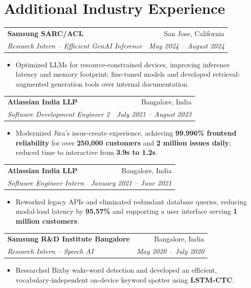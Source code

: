 \documentclass[letterpaper,11pt]{article}
\makeatletter
\newcommand{\role}[4]{%
  \Needspace{4\baselineskip}%
  \begin{tabularx}{\linewidth}{@{}Xr@{}}
    \textbf{#1} & \small #2\\
    \textit{#3} & \small\textit{#4}
  \end{tabularx}\vspace{-1pt}}
\makeatother
\begin{document}
\newpage
\section{Additional Industry Experience}
\role{Samsung SARC/ACL}{San Jose, California}
  {Research Intern -- Efficient GenAI Inference}{May 2024 -- August 2024}
\begin{itemize}
  \item Optimized LLMs for resource-constrained devices, improving inference latency and memory footprint; fine-tuned models and developed retrieval-augmented generation tools over internal documentation.
\end{itemize}
\role{Atlassian India LLP}{Bangalore, India}
  {Software Development Engineer 2}{July 2021 -- August 2023}
\begin{itemize}
  \item Modernized Jira's issue-create experience, achieving \textbf{99.996\% frontend reliability} for over \textbf{250,000 customers} and \textbf{2 million issues daily}; reduced time to interactive from \textbf{3.9s to 1.2s}.
\end{itemize}
\role{Atlassian India LLP}{Bangalore, India}
  {Software Engineer Intern}{January 2021 -- June 2021}
\begin{itemize}
  \item Reworked legacy APIs and eliminated redundant database queries, reducing modal-load latency by \textbf{95.57\%} and supporting a user interface serving \textbf{1 million customers}.
\end{itemize}
\role{Samsung R\&D Institute Bangalore}{Bangalore, India}
  {Research Intern -- Speech AI}{May 2020 -- July 2020}
\begin{itemize}
  \item Researched Bixby wake-word detection and developed an efficient, vocabulary-independent on-device keyword spotter using \textbf{LSTM-CTC}.
\end{itemize}
\end{document}
